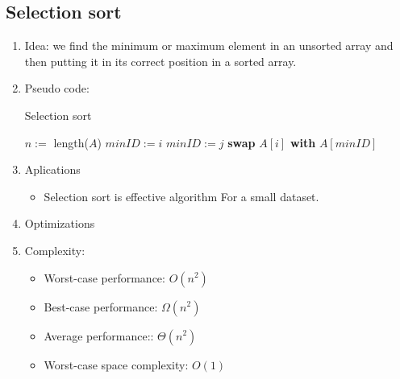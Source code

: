 \documentclass[12pt]{article}
\begin{document}
    \subsection{Selection sort}
    \begin{enumerate}
        \item Idea: we find the minimum or maximum element in an unsorted array and then putting it in its correct position in a sorted array.
        \item Pseudo code:
        \begin{algorithm}[H]
            \caption{Selection sort}
            \begin{algorithmic}[1]
                    \State $n:=$ length($A$)
                        \State $\textit{minID}:=i$
                                \State $\textit{minID}:=j$
                            \EndIf
                        \EndFor
                        \State \textbf{swap} $A[i]$ \textbf{with} $A[\textit{minID}]$
                    \EndFor
                \EndFunction
            \end{algorithmic}
        \end{algorithm}
        \item Aplications
        \begin{itemize}
            \item Selection sort is effective algorithm For a small dataset.
        \end{itemize}
        \item Optimizations
        \item Complexity:
        \begin{itemize}
            \item Worst-case performance: $O(n^2)$
            \item Best-case performance: $\Omega(n^2)$
            \item Average performance:: $\Theta(n^2)$
            \item Worst-case space complexity: $O(1)$
        \end{itemize}
    \end{enumerate}
\end{document}
